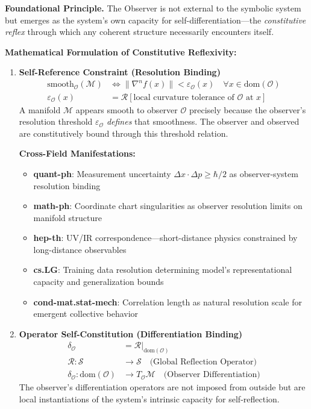 \begin{scholium}
\label{scholium:constitutive_reflex}
\textbf{Foundational Principle.} The Observer is not external to the symbolic system but emerges as the system's own capacity for self-differentiation—the \textit{constitutive reflex} through which any coherent structure necessarily encounters itself.

\textbf{Mathematical Formulation of Constitutive Reflexivity:}

\begin{enumerate}
\item \textbf{Self-Reference Constraint (Resolution Binding)}
\begin{align}
\text{smooth}_{\mathcal{O}}(\mathcal{M}) &\Leftrightarrow \|\nabla^n f(x)\| < \varepsilon_{\mathcal{O}}(x) \quad \forall x \in \text{dom}(\mathcal{O}) \\
\varepsilon_{\mathcal{O}}(x) &= \mathcal{R}[\text{local curvature tolerance of } \mathcal{O} \text{ at } x]
\end{align}
A manifold $\mathcal{M}$ appears smooth to observer $\mathcal{O}$ precisely because the observer's resolution threshold $\varepsilon_{\mathcal{O}}$ \textit{defines} that smoothness. The observer and observed are constitutively bound through this threshold relation.

\textbf{Cross-Field Manifestations:}
\begin{itemize}
\item \textbf{quant-ph}: Measurement uncertainty $\Delta x \cdot \Delta p \geq \hbar/2$ as observer-system resolution binding
\item \textbf{math-ph}: Coordinate chart singularities as observer resolution limits on manifold structure
\item \textbf{hep-th}: UV/IR correspondence—short-distance physics constrained by long-distance observables
\item \textbf{cs.LG}: Training data resolution determining model's representational capacity and generalization bounds
\item \textbf{cond-mat.stat-mech}: Correlation length as natural resolution scale for emergent collective behavior
\end{itemize}

\item \textbf{Operator Self-Constitution (Differentiation Binding)}
\begin{align}
\delta_{\mathcal{O}} &= \mathcal{R}\big|_{\text{dom}(\mathcal{O})} \\
\mathcal{R}: \mathcal{S} &\rightarrow \mathcal{S} \quad \text{(Global Reflection Operator)} \\
\delta_{\mathcal{O}}: \text{dom}(\mathcal{O}) &\rightarrow T_{\mathcal{O}}\mathcal{M} \quad \text{(Observer Differentiation)}
\end{align}
The observer's differentiation operators are not imposed from outside but are local instantiations of the system's intrinsic capacity for self-reflection.


\end{enumerate}
\end{scholium}
